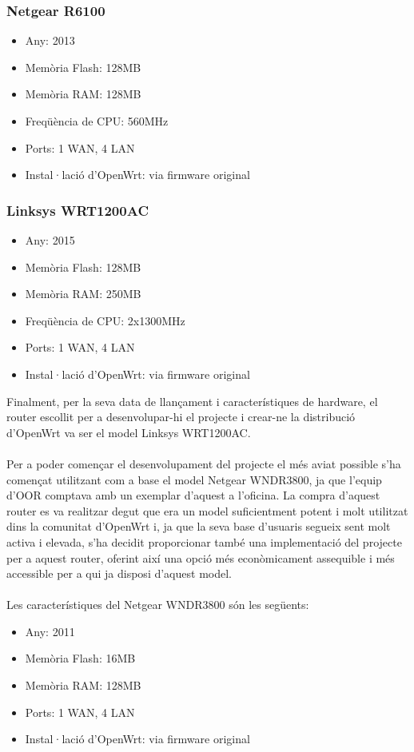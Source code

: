 \documentclass[11pt]{article}
\begin{document}
\subsubsection{Netgear R6100}
\begin{itemize}
\item Any: 2013
\item Memòria Flash: 128MB
\item Memòria RAM: 128MB
\item Freqüència de CPU: 560MHz
\item Ports: 1 WAN, 4 LAN
\item Instal·lació d’OpenWrt: via firmware original
\end{itemize}

\subsubsection{Linksys WRT1200AC}
\begin{itemize}
\item Any: 2015
\item Memòria Flash: 128MB
\item Memòria RAM: 250MB
\item Freqüència de CPU: 2x1300MHz
\item Ports: 1 WAN, 4 LAN
\item Instal·lació d’OpenWrt: via firmware original
\end{itemize}


Finalment, per la seva data de llançament i característiques de hardware, el router escollit per a desenvolupar-hi el projecte i crear-ne la distribució d’OpenWrt va ser el model Linksys WRT1200AC.\\
\\
Per a poder començar el desenvolupament del projecte el més aviat possible s’ha començat utilitzant com a base el model Netgear WNDR3800, ja que l’equip d’OOR comptava amb un exemplar d’aquest a l’oficina. La compra d’aquest router es va realitzar degut que era un model suficientment potent i molt utilitzat dins la comunitat d’OpenWrt i, ja que la seva base d’usuaris segueix sent molt activa i elevada, s’ha decidit proporcionar també una implementació del projecte per a aquest router, oferint així una opció més econòmicament assequible i més accessible per a qui ja disposi d’aquest model.\\
\\
Les característiques del Netgear WNDR3800 són les següents:
\begin{itemize}
\item Any: 2011
\item Memòria Flash: 16MB
\item Memòria RAM: 128MB
\item Ports: 1 WAN, 4 LAN
\item Instal·lació d’OpenWrt: via firmware original
\end{itemize}
\end{document}
